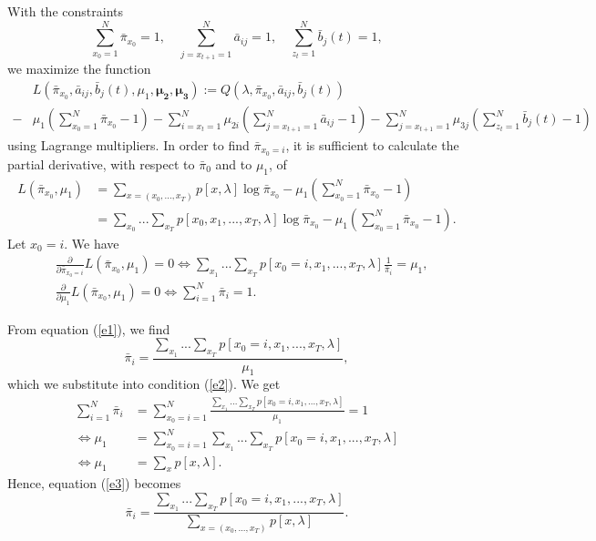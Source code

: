 \documentclass{article}
\begin{document}
With the constraints 
\begin{equation} 
 \sum_{x_0=1}^N \bar \pi_{x_0}  = 1, \quad 
 \sum_{j = x_{t+1}=1}^N \bar a_{ij}  = 1, \quad
 \sum_{z_t=1}^N \bar b_j(t)  = 1, \label{e0}
\end{equation} 
we maximize the function 
\begin{equation} 
\begin{split}
&L(\bar \pi_{x_0},\bar a_{ij},\bar b_j(t), \mu_1,{\boldsymbol{\mu_2}},{\boldsymbol{\mu_3}}) := Q(\lambda, \bar \pi_{x_0},\bar a_{ij},\bar b_j(t)) \\
-& \mu_1\left(\sum_{x_0=1}^N \bar \pi_{x_0} - 1\right) -\sum_{i=x_{t}=1}^N\mu_{2i}\left(\sum_{j=x_{t+1}=1}^N \bar a_{ij}  - 1\right) -\sum_{j=x_{t+1}=1}^N\mu_{3j}\left(\sum_{z_t=1}^N \bar b_j(t) - 1\right) \nonumber
\end{split}
\end{equation} using Lagrange multipliers. 
In order to find $\bar \pi_{x_0 = i}$, it is sufficient to calculate the partial derivative, with respect to $\bar \pi_0$ and to $\mu_1$, of
\begin{equation} 
\begin{split}
L(\bar \pi_{x_0},\mu_1) &= \sum_{x=(x_0,...,x_T)} p[x,\lambda] \log \bar \pi_{x_0} - \mu_1\left(\sum_{x_0=1}^N \bar \pi_{x_0} - 1\right) \\
&= \sum_{x_0}...\sum_{x_T} p[x_0,x_1,...,x_T, \lambda] \log \bar \pi_{x_0} - \mu_1\left(\sum_{x_0=1}^N \bar \pi_{x_0} - 1\right).
\end{split}
\end{equation}
Let $x_0 = i$. We have 
\begin{align} 
 &\frac{\partial}{\partial \bar \pi_{x_0=i}} L(\bar \pi_{x_0},\mu_1) = 0 \Leftrightarrow 
\sum_{x_1}...\sum_{x_T}  p[x_0=i,x_1,...,x_T,\lambda] \frac{1}{\bar \pi_{i}} = \mu_1, \label{e1} \\
& \frac{\partial}{\partial \mu_1} L(\bar \pi_{x_0},\mu_1) = 0 \Leftrightarrow \sum_{i=1}^N \bar \pi_{i} = 1. \label{e2}
\end{align}

From equation (\ref{e1}), we find
\begin{equation}
\bar \pi_i =  \frac{\sum_{x_1}...\sum_{x_T} \label{e3} p[x_0=i,x_1,...,x_T,\lambda]}{\mu_1}, 
\end{equation} which we
substitute into condition (\ref{e2}). 
We get
\begin{align}
\sum_{i=1}^N \bar \pi_{i} &= \sum_{x_0 = i=1}^N \frac{\sum_{x_1} ... \sum_{x_T} p[x_0=i,x_1,...,x_T,\lambda]}{\mu_1} = 1\\
 \Leftrightarrow \mu_1 &= \sum_{x_0 = i=1}^N \sum_{x_1} ... \sum_{x_T} p[x_0=i,x_1,...,x_T,\lambda] \\
  \Leftrightarrow \mu_1 &= \sum_x p[x,\lambda].
\end{align}
Hence, equation (\ref{e3}) becomes
\begin{equation}
\bar \pi_i =  \frac{\sum_{x_1}...\sum_{x_T} \label{e4} p[x_0=i,x_1,...,x_T,\lambda]}{\sum_{x=(x_0,...,x_T)} p[x,\lambda]}. 
\end{equation}
\end{document}
